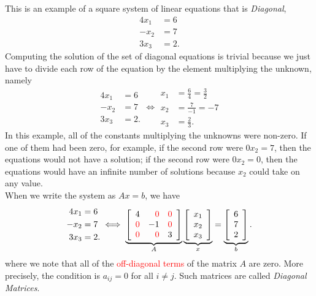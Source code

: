 This is an example of a square system of linear equations that is \textit{Diagonal},
\begin{equation}
    \begin{aligned}
     4 x_1 &=6 \\
      - x_2 &= 7\\
 3 x_3  &= 2.
    \end{aligned}
\end{equation}
Computing the solution of the set of diagonal equations is trivial because we just have to divide each row of the equation by the element multiplying the unknown, namely
\begin{equation}
\label{eq:Diag00}
    \begin{aligned}
     4 x_1 &=6 \\
      - x_2 &= 7\\
 3 x_3  &= 2.
    \end{aligned} \iff     \begin{aligned}
    x_1 &=\frac{6}{4} = \frac{3}{2}\\
      x_2 &= \frac{7}{-1} = -7\\
 x_3  &= \frac{2}{3}.
    \end{aligned} 
\end{equation}
In this example, all of the constants multiplying the unknowns were non-zero. If one of them had been zero, for example, if the second row were $0 x_2 = 7$, then the equations would not have a solution; if the second row were $0 x_2 = 0$, then the equations would have an infinite number of solutions because $x_2$ could take on any value.\\

When we write the system as $Ax=b$, we have
\begin{equation} 
\label{eq:Diag01}
\begin{aligned}
     4 x_1 &=6 \\
      - x_2 &= 7\\
 3 x_3  &= 2.
    \end{aligned}\iff \underbrace{\left[\begin{array}{rrr} 4 & \color{red} 0 & \color{red} 0\\
\color{red} 0 & -1 & \color{red} 0 \\ \color{red} 0 &\color{red} 0 & 3  \end{array}\right]}_{A}  \underbrace{\left[\begin{array}{c} x_1 \\x_2 \\x_3\end{array} \right]}_{x}
= \underbrace{\left[\begin{array}{r} 6 \\7 \\2\end{array} \right]}_{b}.
\end{equation}
where we note that all of the \textcolor{red}{off-diagonal terms} of the matrix $A$ are zero. More precisely, the condition is 
 $a_{ij}=0$ for all $i \neq j$. Such matrices are called \textit{Diagonal Matrices}. \\
 
